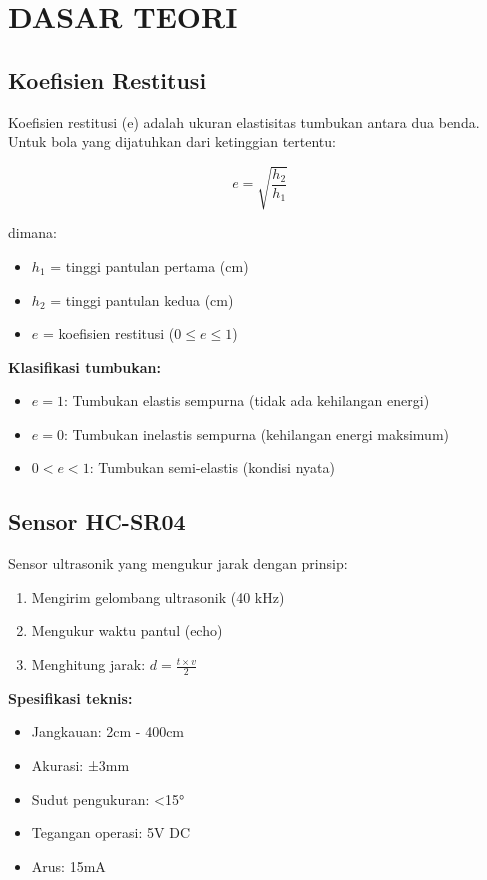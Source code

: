 \documentclass[12pt,a4paper]{article}
\begin{document}
\section{DASAR TEORI}

\subsection{Koefisien Restitusi}
Koefisien restitusi (e) adalah ukuran elastisitas tumbukan antara dua benda. Untuk bola yang dijatuhkan dari ketinggian tertentu:

\begin{equation}
e = \sqrt{\frac{h_2}{h_1}}
\end{equation}

dimana:
\begin{itemize}
    \item $h_1$ = tinggi pantulan pertama (cm)
    \item $h_2$ = tinggi pantulan kedua (cm)  
    \item $e$ = koefisien restitusi ($0 \leq e \leq 1$)
\end{itemize}

\textbf{Klasifikasi tumbukan:}
\begin{itemize}
    \item $e = 1$: Tumbukan elastis sempurna (tidak ada kehilangan energi)
    \item $e = 0$: Tumbukan inelastis sempurna (kehilangan energi maksimum)
    \item $0 < e < 1$: Tumbukan semi-elastis (kondisi nyata)
\end{itemize}

\subsection{Sensor HC-SR04}
Sensor ultrasonik yang mengukur jarak dengan prinsip:
\begin{enumerate}
    \item Mengirim gelombang ultrasonik (40 kHz)
    \item Mengukur waktu pantul (echo)
    \item Menghitung jarak: $d = \frac{t \times v}{2}$
\end{enumerate}

\textbf{Spesifikasi teknis:}
\begin{itemize}
    \item Jangkauan: 2cm - 400cm
    \item Akurasi: ±3mm
    \item Sudut pengukuran: <15°
    \item Tegangan operasi: 5V DC
    \item Arus: 15mA
\end{itemize}
\end{document}
